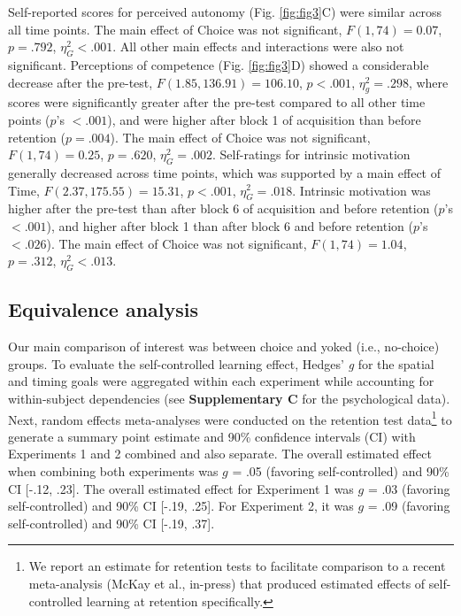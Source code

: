 \documentclass[
  man, donotrepeattitle,floatsintext]{apa7}
\begin{document}
Self-reported scores for perceived autonomy (Fig. \ref{fig:fig3}C) were similar across all time points. The main effect of Choice was not significant, \(F(1,74) = 0.07\), \(p = .792\), \(\eta_{G}^2 < .001\). All other main effects and interactions were also not significant. Perceptions of competence (Fig. \ref{fig:fig3}D) showed a considerable decrease after the pre-test, \(F(1.85,136.91) = 106.10\), \(p < .001\), \(\eta_{g}^2 = .298\), where scores were significantly greater after the pre-test compared to all other time points (\(p\)'s \(< .001\)), and were higher after block 1 of acquisition than before retention (\(p = .004\)). The main effect of Choice was not significant, \(F(1,74) = 0.25\), \(p = .620\), \(\eta_{G}^2 = .002\). Self-ratings for intrinsic motivation generally decreased across time points, which was supported by a main effect of Time, \(F(2.37,175.55) = 15.31\), \(p < .001\), \(\eta_{G}^2 = .018\). Intrinsic motivation was higher after the pre-test than after block 6 of acquisition and before retention (\(p\)'s \(< .001\)), and higher after block 1 than after block 6 and before retention (\(p\)'s \(< .026\)). The main effect of Choice was not significant, \(F(1,74) = 1.04\), \(p = .312\), \(\eta_{G}^2 < .013\).

\hypertarget{equivalence-analysis}{%
\subsection{Equivalence analysis}\label{equivalence-analysis}}

Our main comparison of interest was between choice and yoked (i.e., no-choice) groups. To evaluate the self-controlled learning effect, Hedges' \emph{g} for the spatial and timing goals were aggregated within each experiment while accounting for within-subject dependencies (see \textbf{Supplementary C} for the psychological data). Next, random effects meta-analyses were conducted on the retention test data\footnote{We report an estimate for retention tests to facilitate comparison to a recent meta-analysis (McKay et al., in-press) that produced estimated effects of self-controlled learning at retention specifically.} to generate a summary point estimate and 90\% confidence intervals (CI) with Experiments 1 and 2 combined and also separate. The overall estimated effect when combining both experiments was \(g\) = .05 (favoring self-controlled) and 90\% CI {[}-.12, .23{]}. The overall estimated effect for Experiment 1 was \(g\) = .03 (favoring self-controlled) and 90\% CI {[}-.19, .25{]}. For Experiment 2, it was \(g\) = .09 (favoring self-controlled) and 90\% CI {[}-.19, .37{]}.
\end{document}
